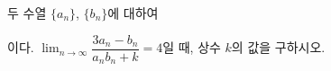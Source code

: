 두 수열 $\{a_n\}$, $\{b_n\}$에 대하여 \par\smallskip{}\par\smallskip\noindent 이다. $\displaystyle\lim_{n\to\infty}\dfrac{3a_n-b_n}{a_nb_n+k}=4$일 때, 상수 $k$의 값을 구하시오.
